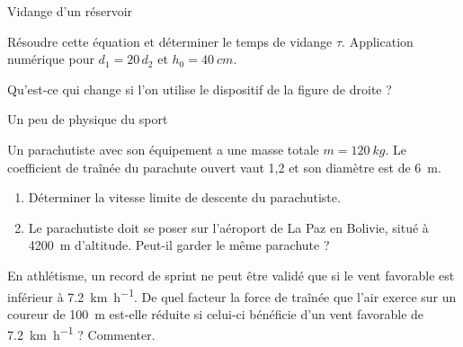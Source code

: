 \begin{exo}[PC][1]{Vidange d'un réservoir}
\begin{quest}
\item Résoudre cette équation et déterminer le temps de vidange $\tau$. Application numérique pour $d_1=20\,d_2$ et $h_{0}=\SI{40}{cm}$.


\item Qu’est-ce qui change si l’on utilise le dispositif de la figure de droite ?


\end{quest}
\end{exo}

\begin{exo}[PC][1]{Un peu de physique du sport}
\begin{quest}
\item Un parachutiste avec son équipement a une masse totale $m=\SI{120}{kg}$. Le coefficient de traînée du parachute ouvert vaut 1,2 et son diamètre est de \SI{6}{m}.
\begin{enumerate}
\item Déterminer la vitesse limite de descente du parachutiste.
\item Le parachutiste doit se poser sur l'aéroport de La Paz en Bolivie, situé à \SI{4200}{m} d'altitude. Peut-il garder le même parachute ?
\end{enumerate}
\item En athlétisme, un record de sprint ne peut être validé que si le vent favorable est inférieur à \SI{7,2}{km.h^{-1}}. De quel facteur la force de traînée que l'air exerce sur un coureur de \SI{100}{m} est-elle réduite si celui-ci bénéficie d'un vent favorable de \SI{7,2}{km.h^{-1}} ? Commenter.
\end{quest}
\end{exo}

